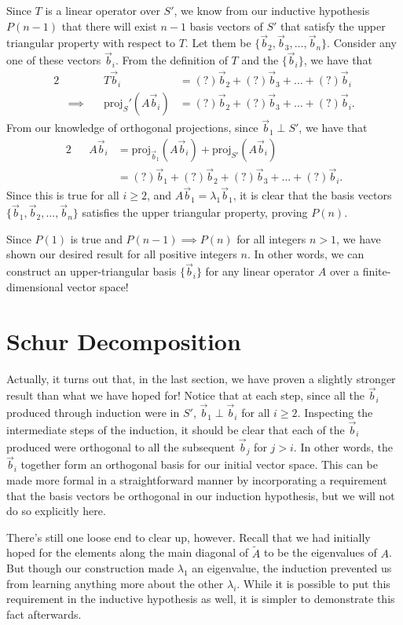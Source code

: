 \documentclass[letterpaper]{article}
\theoremstyle{remark}
\renewcommand{\tilde}[1]{\widetilde{#1}}
\newcommand{\eqn}[1]{\begin{alignat*}{2}#1\end{alignat*}}
\newcommand*{\thus}{&\implies\quad&}
\begin{document}
Since $T$ is a linear operator over $S'$, we know from our inductive hypothesis $P(n-1)$ that there will exist $n-1$ basis vectors of $S'$ that satisfy the upper triangular property with respect to $T$. Let them be $\{ \vec{b}_2, \vec{b}_3, \ldots, \vec{b}_n \}$. Consider any one of these vectors $\vec{b}_i$. From the definition of $T$ and the $\{\vec{b}_i\}$, we have that
\eqn{
    && T\vec{b}_i &= (?)\vec{b}_2 + (?)\vec{b}_3 + \ldots + (?)\vec{b}_{i} \\
    \thus \mathrm{proj}_S'(A\vec{b}_i) &= (?)\vec{b}_2 + (?)\vec{b}_3 + \ldots + (?)\vec{b}_{i}.
}
From our knowledge of orthogonal projections, since $\vec{b}_1 \perp S'$, we have that
\eqn{
    && A\vec{b}_i &= \mathrm{proj}_{\vec{b}_1}(A\vec{b}_i) + \mathrm{proj}_{S'}(A\vec{b}_i) \\
    &&&= (?)\vec{b}_1 + (?)\vec{b}_2 + (?)\vec{b}_3 + \ldots + (?)\vec{b}_{i}.
}
Since this is true for all $i \ge 2$, and $A\vec{b}_1 = \lambda_1\vec{b}_1$, it is clear that the basis vectors $\{\vec{b}_1, \vec{b}_2, \ldots, \vec{b}_n\}$ satisfies the upper triangular property, proving $P(n)$.

Since $P(1)$ is true and $P(n-1) \implies P(n)$ for all integers $n > 1$, we have shown our desired result for all positive integers $n$. In other words, we can construct an upper-triangular basis $\{ \vec{b}_i \}$ for any linear operator $A$ over a finite-dimensional vector space!

\section{Schur Decomposition}
Actually, it turns out that, in the last section, we have proven a slightly stronger result than what we have hoped for! Notice that at each step, since all the $\vec{b}_i$ produced through induction were in $S'$, $\vec{b}_1 \perp \vec{b}_i$ for all $i \ge 2$. Inspecting the intermediate steps of the induction, it should be clear that each of the $\vec{b}_i$ produced were orthogonal to all the subsequent $\vec{b}_j$ for $j > i$. In other words, the $\vec{b}_i$ together form an orthogonal basis for our initial vector space. This can be made more formal in a straightforward manner by incorporating a requirement that the basis vectors be orthogonal in our induction hypothesis, but we will not do so explicitly here.

There's still one loose end to clear up, however. Recall that we had initially hoped for the elements along the main diagonal of $\tilde{A}$ to be the eigenvalues of $A$. But though our construction made $\lambda_1$ an eigenvalue, the induction prevented us from learning anything more about the other $\lambda_i$. While it is possible to put this requirement in the inductive hypothesis as well, it is simpler to demonstrate this fact afterwards.
\end{document}
